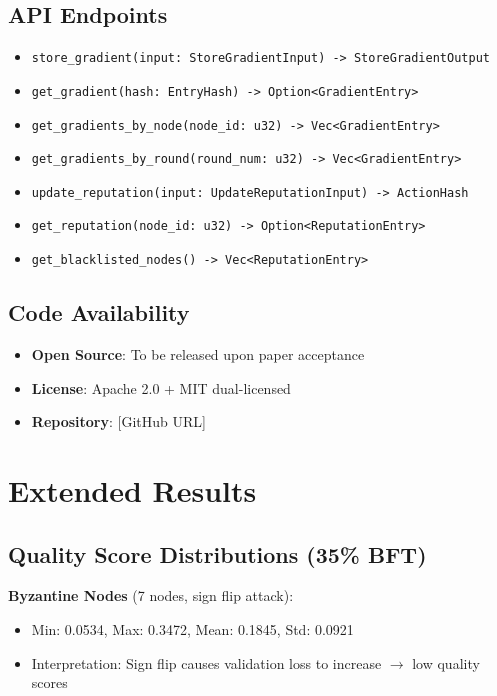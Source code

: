 \subsection{API Endpoints}
\begin{itemize}
    \item \texttt{store\_gradient(input: StoreGradientInput) -> StoreGradientOutput}
    \item \texttt{get\_gradient(hash: EntryHash) -> Option<GradientEntry>}
    \item \texttt{get\_gradients\_by\_node(node\_id: u32) -> Vec<GradientEntry>}
    \item \texttt{get\_gradients\_by\_round(round\_num: u32) -> Vec<GradientEntry>}
    \item \texttt{update\_reputation(input: UpdateReputationInput) -> ActionHash}
    \item \texttt{get\_reputation(node\_id: u32) -> Option<ReputationEntry>}
    \item \texttt{get\_blacklisted\_nodes() -> Vec<ReputationEntry>}
\end{itemize}

\subsection{Code Availability}
\begin{itemize}
    \item \textbf{Open Source}: To be released upon paper acceptance
    \item \textbf{License}: Apache 2.0 + MIT dual-licensed
    \item \textbf{Repository}: [GitHub URL]
\end{itemize}

\section{Extended Results}

\subsection{Quality Score Distributions (35\% BFT)}

\textbf{Byzantine Nodes} (7 nodes, sign flip attack):
\begin{itemize}
    \item Min: 0.0534, Max: 0.3472, Mean: 0.1845, Std: 0.0921
    \item Interpretation: Sign flip causes validation loss to increase $\rightarrow$ low quality scores
\end{itemize}

